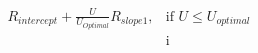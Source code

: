 \documentclass[preview]{standalone}
\begin{document}
\begin{align*}
R_{intercept} +  \frac{U}{U_{Optimal}} R_{slope1}, & \text{if }  U \leq U_{optimal}  \\[6pt] & \text{i}
\end{align*}
\end{document}
